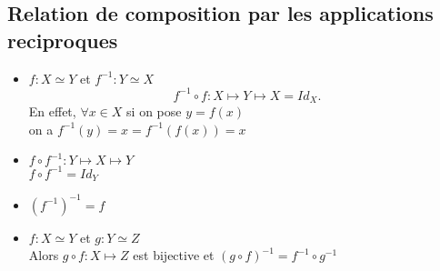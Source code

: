 \documentclass[../main.tex]{subfiles}
\begin{document}
\subsection{Relation de composition par les applications reciproques}

\begin{itemize}
	\item$f: X \simeq Y$ et  $ f^{-1}: Y \simeq X$ \\
\[ 
	f^{-1} \circ f: X \mapsto Y \mapsto X = Id_{X}.
\]
En effet, $\forall x \in X$ si on pose $y = f(x)$ \\
on a $f^{-1} ( y) = x = f^{-1}(f(x)) = x$
\item $f \circ f^{-1}: Y \mapsto X \mapsto Y$ \\
	$f\circ f^{-1} = Id_Y$ \\
\item $ ( f^{-1})^{-1} =f$ 
\item $f: X \simeq Y$ et $g: Y \simeq Z$ \\
	Alors $g\circ f: X \mapsto Z$ est bijective et $ ( g\circ f)^{-1} = f^{-1} \circ g^{-1}$
\end{itemize}
\end{document}
